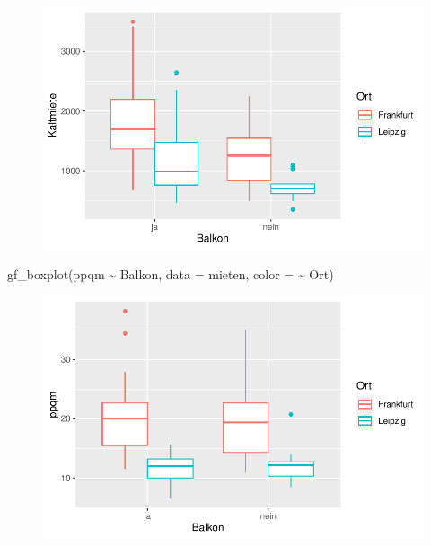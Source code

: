 \documentclass[
  a4paper,
  DIV=11]{scrartcl}
\newenvironment{Shaded}{\begin{snugshade}}{\end{snugshade}}
\newcommand{\AttributeTok}[1]{\textcolor[rgb]{0.40,0.45,0.13}{#1}}
\newcommand{\FunctionTok}[1]{\textcolor[rgb]{0.28,0.35,0.67}{#1}}
\newcommand{\NormalTok}[1]{\textcolor[rgb]{0.00,0.23,0.31}{#1}}
\newcommand{\SpecialCharTok}[1]{\textcolor[rgb]{0.37,0.37,0.37}{#1}}
\begin{document}
\begin{figure}[H]

{\centering \includegraphics{Mietmodellierung_files/figure-pdf/unnamed-chunk-19-1.pdf}

}

\end{figure}

\begin{Shaded}
\begin{Highlighting}[]
\FunctionTok{gf\_boxplot}\NormalTok{(ppqm }\SpecialCharTok{\textasciitilde{}}\NormalTok{ Balkon, }\AttributeTok{data =}\NormalTok{ mieten, }\AttributeTok{color =} \SpecialCharTok{\textasciitilde{}}\NormalTok{ Ort)}
\end{Highlighting}
\end{Shaded}

\begin{figure}[H]

{\centering \includegraphics{Mietmodellierung_files/figure-pdf/unnamed-chunk-19-2.pdf}

}

\end{figure}
\end{document}
